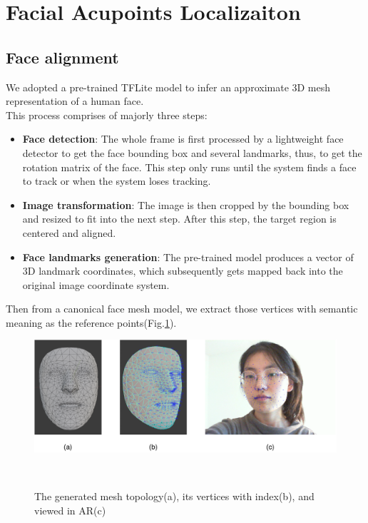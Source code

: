 \section{Facial Acupoints Localizaiton}
\label{sec:measure-and-methods}

\subsection{Face alignment}
\label{sec:implement-face-alignment}
We adopted a pre-trained TFLite model\cite{kartynnik2019real} to infer an approximate 3D mesh representation of a human face.\\
This process comprises of majorly three steps:
\begin{itemize}
    \item \textbf{Face detection}: The whole frame is first processed by a lightweight face detector to get the face bounding box and several landmarks, thus, to get the rotation matrix of the face. This step only runs until the system finds a face to track or when the system loses tracking.
    \item \textbf{Image transformation}: The image is then cropped by the bounding box and resized to fit into the next step. After this step, the target region is centered and aligned.
    \item \textbf{Face landmarks generation}: The pre-trained model produces a vector of 3D landmark coordinates, which subsequently gets mapped back into the original image coordinate system.
\end{itemize}
Then from a canonical face mesh model, we extract those vertices with semantic meaning as the reference points(Fig.\ref{fig:face_mesh}).
\begin{figure}
  \centering
    \includegraphics[width=0.9\columnwidth]{figures/facemesh.pdf}
    \caption{The generated mesh topology(a), its vertices with index(b), and viewed in AR(c)}~\label{fig:face_mesh}
  \end{figure}

